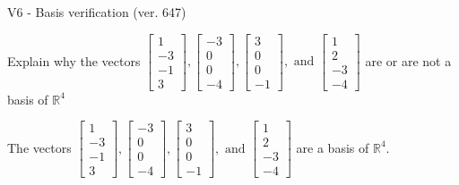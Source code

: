 \begin{exercise}
  \begin{exerciseTitle}V6 - Basis verification (ver. 647)\end{exerciseTitle}
  \begin{exerciseStatement}
    Explain why the vectors \(\left[\begin{array}{r}
1 \\
-3 \\
-1 \\
3
\end{array}\right] , \left[\begin{array}{r}
-3 \\
0 \\
0 \\
-4
\end{array}\right] , \left[\begin{array}{r}
3 \\
0 \\
0 \\
-1
\end{array}\right] , \text{ and } \left[\begin{array}{r}
1 \\
2 \\
-3 \\
-4
\end{array}\right]\) are or are not a basis of \(\mathbb{R}^4\)	


  \end{exerciseStatement}
  \begin{exerciseAnswer}
   The vectors \(\left[\begin{array}{r}
1 \\
-3 \\
-1 \\
3
\end{array}\right] , \left[\begin{array}{r}
-3 \\
0 \\
0 \\
-4
\end{array}\right] , \left[\begin{array}{r}
3 \\
0 \\
0 \\
-1
\end{array}\right] , \text{ and } \left[\begin{array}{r}
1 \\
2 \\
-3 \\
-4
\end{array}\right]\) 
  	 are  a basis of \(\mathbb{R}^4\).
  


  \end{exerciseAnswer}
\end{exercise}